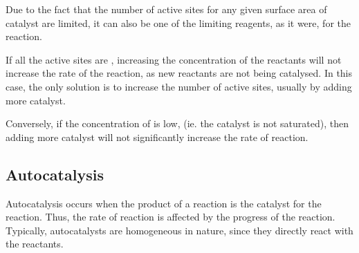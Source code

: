 				Due to the fact that the number of active sites for any given surface area of catalyst are limited, it can also be one of
				the limiting reagents, as it were, for the reaction.

				If all the active sites are , increasing the concentration of the reactants will not increase the rate of
				the reaction, as new reactants are not being catalysed. In this case, the only solution is to increase the number of active
				sites, usually by adding more catalyst.

				Conversely, if the concentration of  is low, (ie. the catalyst is not saturated), then adding more catalyst
				will not significantly increase the rate of reaction.



		\subsection{Autocatalysis}

			Autocatalysis occurs when the product of a reaction is the catalyst for the reaction. Thus, the rate of reaction is affected
			by the progress of the reaction. Typically, autocatalysts are homogeneous in nature, since they directly react with the reactants.

			\begin{center}
			\end{center}


